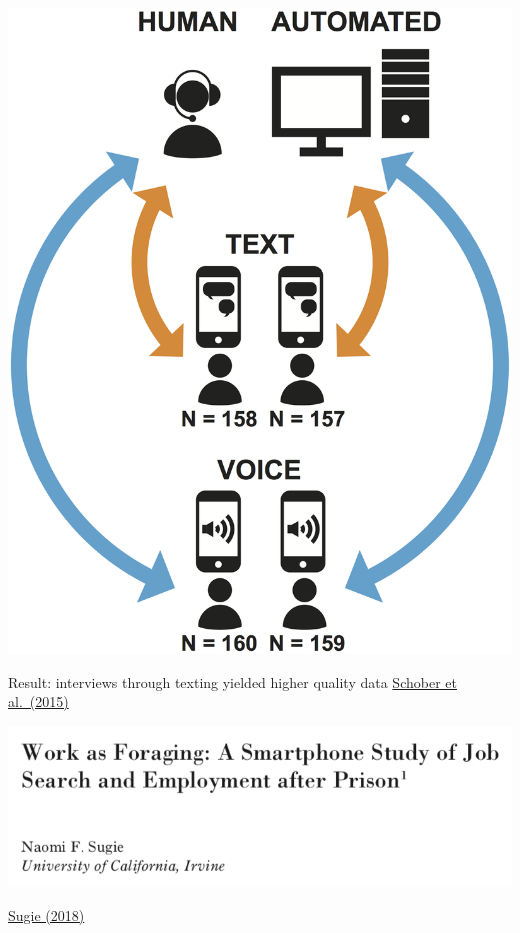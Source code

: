 \documentclass[aspectratio=169]{beamer}
\begin{document}
\begin{frame}

\begin{center}
\includegraphics[height=0.6\textheight]{figures/schober_precision_2015_fig1}
\end{center}

\pause
Result: interviews through texting yielded higher quality data
\vfill
\href{https://doi.org/10.1371/journal.pone.0128337}{Schober et al.\ (2015)}

\end{frame}
\begin{frame}

\begin{center}
\includegraphics[width=\textwidth]{figures/sugie_work_2018_title}
\end{center}

\vfill
\href{https://doi.org/10.1086/696209}{Sugie (2018)}

\end{frame}
\end{document}
